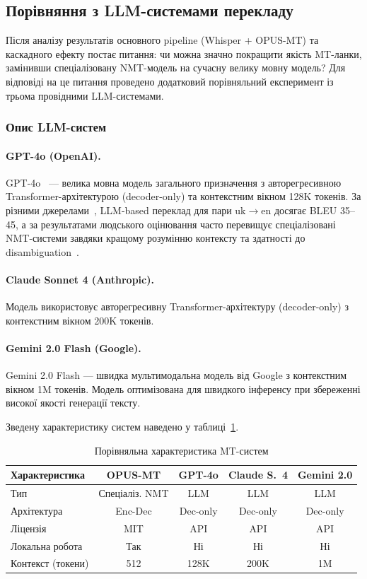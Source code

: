 \subsection{Порівняння з LLM-системами перекладу}
\label{subsec:llm_comparison}

Після аналізу результатів основного pipeline (Whisper + OPUS-MT)
та каскадного ефекту постає питання: чи можна значно покращити якість
MT-ланки, замінивши спеціалізовану NMT-модель на сучасну велику мовну модель?
Для відповіді на це питання проведено додатковий порівняльний експеримент
із трьома провідними LLM-системами.

\subsubsection{Опис LLM-систем}

\paragraph{GPT-4o (OpenAI).}
GPT-4o~\cite{gpt4} --- велика мовна модель загального призначення з
авторегресивною Transformer-архітектурою (decoder-only) та контекстним
вікном 128K токенів. За різними джерелами~\cite{hendy_llm_mt}, LLM-based
переклад для пари uk$\to$en досягає BLEU 35--45, а за результатами
людського оцінювання часто перевищує спеціалізовані NMT-системи завдяки
кращому розумінню контексту та здатності до disambiguation~\cite{llm_mt}.

\paragraph{Claude Sonnet 4 (Anthropic).}
Модель використовує авторегресивну Transformer-архітектуру (decoder-only)
з контекстним вікном 200K токенів.

\paragraph{Gemini 2.0 Flash (Google).}
Gemini 2.0 Flash --- швидка мультимодальна модель від Google з контекстним
вікном 1M токенів. Модель оптимізована для швидкого інференсу при збереженні
високої якості генерації тексту.

Зведену характеристику систем наведено у таблиці~\ref{tab:mt_comparison}.

\begin{table}[h]
\centering
\caption{Порівняльна характеристика MT-систем}
\label{tab:mt_comparison}
\small
\begin{tabular}{|l|c|c|c|c|}
\hline
Характеристика & OPUS-MT & GPT-4o & Claude S.~4 & Gemini 2.0\\
\hline
Тип & Спеціаліз. NMT & LLM & LLM & LLM\\
Архітектура & Enc-Dec & Dec-only & Dec-only & Dec-only\\
Ліцензія & MIT & API & API & API\\
Локальна робота & Так & Ні & Ні & Ні\\
Контекст (токени) & 512 & 128K & 200K & 1M\\
\hline
\end{tabular}
\end{table}

